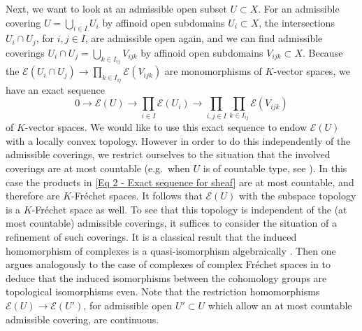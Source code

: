 \documentclass[a4paper, reqno, 10pt]{amsart}
\theoremstyle{definition}
\numberwithin{equation}{section}
\newcommand{\lra}{\longrightarrow}
\newcommand{\ra}{\rightarrow}
\newcommand{\CE}{{\mathcal {E}}}
\begin{document}
Next, we want to look at an admissible open subset $U \subset X$.
For an admissible covering $U = \bigcup_{i\in I} U_i$ by affinoid open subdomains $U_i\subset X$, the intersections $U_i \cap U_j$, for $i,j\in I$, are admissible open again, and we can find admissible coverings $U_i \cap U_j = \bigcup_{k\in I_{ij}} V_{ijk}$ by affinoid open subdomains $V_{ijk}\subset X$.
Because the $\CE(U_i \cap U_j) \ra \prod_{k\in I_{ij}} \CE(V_{ijk})$ are monomorphisms of $K$-vector spaces, we have an exact sequence
\begin{equation}\label{Eq 2 - Exact sequence for sheaf}
	0 \lra \CE(U) \lra \prod_{i\in I} \CE(U_i) \lra \prod_{i,j\in I} \prod_{k\in I_{ij}} \CE(V_{ijk}) 
\end{equation}
of $K$-vector spaces.
We would like to use this exact sequence to endow $\CE(U)$ with a locally convex topology.
However in order to do this independently of the admissible coverings, we restrict ourselves to the situation that the involved coverings are at most countable (e.g.\ when $U$ is of countable type, see ).
In this case the products in \eqref{Eq 2 - Exact sequence for sheaf} are at most countable, and therefore are $K$-Fr\'echet spaces.
It follows that $\CE(U)$ with the subspace topology is a $K$-Fr\'echet space as well.
To see that this topology is independent of the (at most countable) admissible coverings, it suffices to consider the situation of a refinement of such coverings.
It is a classical result that the induced homomorphism of complexes is a quasi-isomorphism algebraically \cite[6.2 Thm.\ 5]{Bosch14LectFormRigidGeom}.
Then one argues analogously to the case of complexes of complex Fr\'echet spaces in \cite[VII.\ Lemma 1.32]{BanicaStanasila76AlgMethGlobThComplSp} to deduce that the induced isomorphisms between the cohomology groups are topological isomorphisms even.
Note that the restriction homomorphisms $\CE(U) \ra \CE(U')$, for admissible open $U'\subset U$ which allow an at most countable admissible covering, are continuous.
\end{document}
